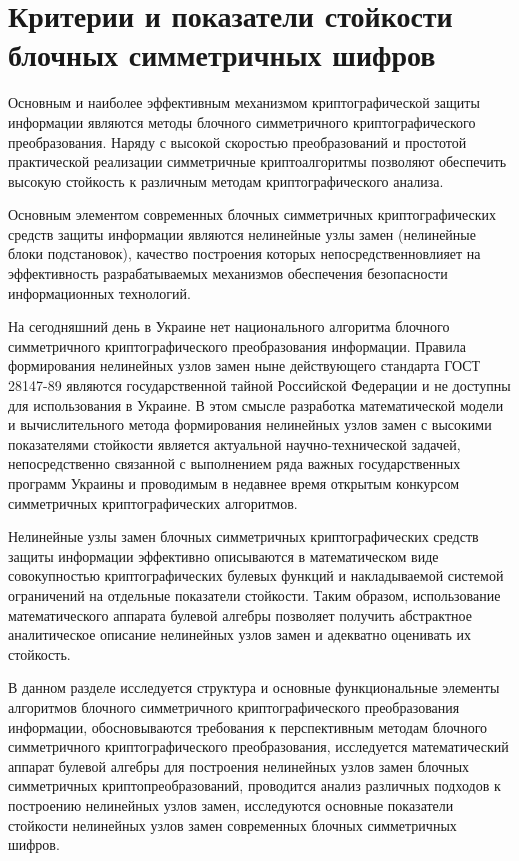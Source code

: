 \chapter{Критерии и показатели стойкости блочных симметричных шифров}

Основным и наиболее эффективным механизмом криптографической защиты информации
являются методы блочного симметричного криптографического преобразования.
Наряду с высокой скоростью преобразований и простотой практической реализации
симметричные криптоалгоритмы позволяют обеспечить высокую стойкость к различным
методам криптографического анализа.

Основным элементом современных блочных симметричных криптографических средств
защиты информации являются нелинейные узлы замен (нелинейные блоки подстановок),
качество построения которых непосредственновлияет на эффективность
разрабатываемых механизмов обеспечения безопасности информационных технологий.

На сегодняшний день в Украине нет национального алгоритма блочного симметричного
криптографического преобразования информации. Правила формирования нелинейных
узлов замен ныне действующего стандарта ГОСТ 28147-89 являются государственной
тайной Российской Федерации и не доступны для использования в Украине. В этом
смысле разработка математической модели и вычислительного метода формирования
нелинейных узлов замен с  высокими показателями стойкости является актуальной
научно-технической задачей, непосредственно связанной с выполнением ряда важных
государственных программ Украины и проводимым в недавнее время открытым
конкурсом симметричных криптографических алгоритмов.

Нелинейные узлы замен блочных  симметричных криптографических средств защиты
информации эффективно описываются в математическом виде совокупностью
криптографических булевых функций и накладываемой системой ограничений на
отдельные показатели стойкости. Таким образом, использование математического
аппарата булевой алгебры позволяет получить абстрактное аналитическое описание
нелинейных узлов замен и адекватно оценивать их стойкость.

В данном разделе исследуется структура и основные функциональные элементы
алгоритмов блочного симметричного криптографического преобразования информации,
обосновываются требования к перспективным методам блочного симметричного
криптографического преобразования, исследуется математический аппарат булевой
алгебры для построения нелинейных узлов замен  блочных симметричных
криптопреобразований, проводится анализ различных подходов к построению
нелинейных узлов замен, исследуются основные показатели стойкости нелинейных
узлов замен современных блочных симметричных шифров.

